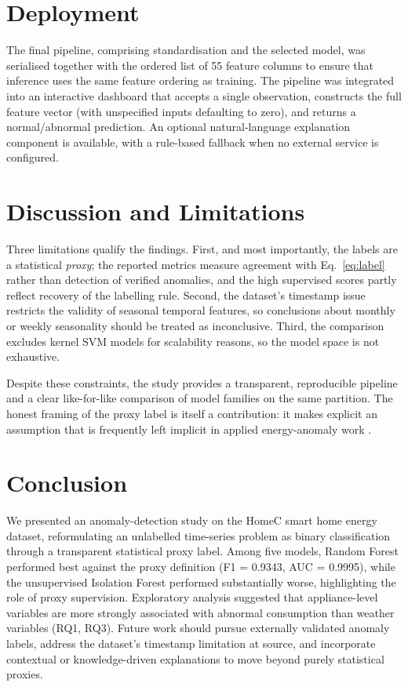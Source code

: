 \documentclass[pdflatex,sn-mathphys-num]{sn-jnl}%
\theoremstyle{thmstyleone}%
\theoremstyle{thmstyletwo}%
\theoremstyle{thmstylethree}%
\begin{document}
\section{Deployment}\label{sec7}

The final pipeline, comprising standardisation and the selected model, was serialised together with the ordered list of 55 feature columns to ensure that inference uses the same feature ordering as training. The pipeline was integrated into an interactive dashboard that accepts a single observation, constructs the full feature vector (with unspecified inputs defaulting to zero), and returns a normal/abnormal prediction. An optional natural-language explanation component is available, with a rule-based fallback when no external service is configured.

\section{Discussion and Limitations}\label{sec8}

Three limitations qualify the findings. First, and most importantly, the labels are a statistical \emph{proxy}; the reported metrics measure agreement with Eq.~\eqref{eq:label} rather than detection of verified anomalies, and the high supervised scores partly reflect recovery of the labelling rule. Second, the dataset's timestamp issue restricts the validity of seasonal temporal features, so conclusions about monthly or weekly seasonality should be treated as inconclusive. Third, the comparison excludes kernel SVM models for scalability reasons, so the model space is not exhaustive.

Despite these constraints, the study provides a transparent, reproducible pipeline and a clear like-for-like comparison of model families on the same partition. The honest framing of the proxy label is itself a contribution: it makes explicit an assumption that is frequently left implicit in applied energy-anomaly work \cite{ambat2025}.

\section{Conclusion}\label{sec9}

We presented an anomaly-detection study on the HomeC smart home energy dataset, reformulating an unlabelled time-series problem as binary classification through a transparent statistical proxy label. Among five models, Random Forest performed best against the proxy definition (F1 = 0.9343, AUC = 0.9995), while the unsupervised Isolation Forest performed substantially worse, highlighting the role of proxy supervision. Exploratory analysis suggested that appliance-level variables are more strongly associated with abnormal consumption than weather variables (RQ1, RQ3). Future work should pursue externally validated anomaly labels, address the dataset's timestamp limitation at source, and incorporate contextual or knowledge-driven explanations to move beyond purely statistical proxies.
\end{document}
